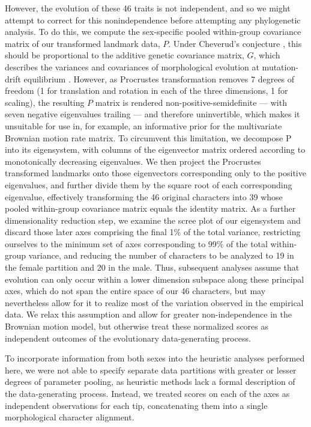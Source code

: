 \documentclass[10pt, twocolumn, twoside]{article}
\begin{document}
However, the evolution of these 46 traits is not independent, and so we might attempt to correct for this nonindependence before attempting any phylogenetic analysis. To do this, we compute the sex-specific pooled within-group covariance matrix of our transformed landmark data, $P$. Under Cheverud's conjecture \citep{cheverudDevelopmentalIntegrationEvolution1996}, this should be proportional to the additive genetic covariance matrix, $G$, which describes the variances and covariances of morphological evolution at mutation-drift equilibrium \citep{weaverNeutralTheoryEvolution2018a}. However, as Procrustes transformation removes 7 degrees of freedom (1 for translation and rotation in each of the three dimensions, 1 for scaling), the resulting $P$ matrix is rendered non-positive-semidefinite --- with seven negative eigenvalues trailing --- and therefore uninvertible, which makes it unsuitable for use in, for example, an informative prior for the multivariate Brownian motion rate matrix. To circumvent this limitation, we decompose P into its eigensystem, with columns of the eigenvector matrix ordered according to monotonically decreasing eigenvalues. We then project the Procrustes transformed landmarks onto those eigenvectors corresponding only to the positive eigenvalues, and further divide them by the square root of each corresponding eigenvalue, effectively transforming the 46 original characters into 39 whose pooled within-group covariance matrix equals the identity matrix. As a further dimensionality reduction step, we examine the scree plot of our eigensystem and discard those later axes comprising the final 1\% of the total variance, restricting ourselves to the minimum set of axes corresponding to 99\% of the total within-group variance, and reducing the number of characters to be analyzed to 19 in the female partition and 20 in the male. Thus, subsequent analyses assume that evolution can only occur within a lower dimension subspace along these principal axes, which do not span the entire space of our 46 characters, but may nevertheless allow for it to realize most of the variation observed in the empirical data. We relax this assumption and allow for greater non-independence in the Brownian motion model, but otherwise treat these normalized scores as independent outcomes of the evolutionary data-generating process.

To incorporate information from both sexes into the heuristic analyses performed here, we were not able to specify separate data partitions with greater or lesser degrees of parameter pooling, as heuristic methods lack a formal description of the data-generating process. Instead, we treated scores on each of the axes as independent observations for each tip, concatenating them into a single morphological character alignment.
\end{document}
